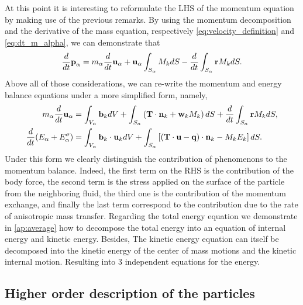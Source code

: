 At this point it is interesting to reformulate the LHS of the momentum equation by making use of the previous remarks. 
By using the momentum decomposition and the derivative of the mass equation, respectively \ref{eq:velocity_definition} and \ref{eq:dt_m_alpha}, we can demonstrate that
\begin{equation*}
    \frac{d}{d t} \textbf{p}_\alpha 
    = m_\alpha  \frac{d}{d t} \textbf{u}_\alpha
    + \textbf{u}_\alpha \int_{S_\alpha} M_k dS  
    - \frac{d}{d t} \int_{S_\alpha} \textbf{r}M_k dS.
\end{equation*}
Above all of those considerations, we can re-write the momentum and energy balance equations under a more simplified form, namely, 
\begin{align}
    \label{eq:u_alpha_dt}
    m_\alpha \frac{d}{d t} \textbf{u}_\alpha 
    &= \int_{V_\alpha} \textbf{b}_k dV
    + \int_{S_\alpha} \left(
    \textbf{T}\cdot\textbf{n}_k
    +\textbf{w}_k M_k
    \right)dS
    + \frac{d}{d t} \int_{S_\alpha} \textbf{r}M_k dS,\\
    \label{eq:dt_e_esig_alpha}
    \frac{d}{d t} (E_\alpha + E^\sigma_\alpha) 
    &= \int_{V_\alpha} \textbf{b}_k \cdot \textbf{u}_k dV
    + \int_{S_\alpha} \left[
        (\textbf{T}\cdot \textbf{u} 
    - \textbf{q})\cdot\textbf{n}_k 
    - M_k E_k 
    \right]dS.
\end{align}
Under this form we clearly distinguish the contribution of phenomenons to the momentum balance. 
Indeed, the first term on the RHS is the contribution of the body force, the second term is the stress applied on the surface of the particle from the neighboring fluid, the third one is the contribution of the momentum exchange, and finally the last term correspond to the contribution due to the rate of anisotropic mass transfer. 
Regarding the total energy equation we demonstrate in \ref{ap:average} how to decompose the total energy into an equation of internal energy and kinetic energy. 
Besides, The kinetic energy equation can itself be decomposed into the kinetic energy of the center of mass motions and the kinetic internal motion.
Resulting into 3 independent equations for the energy.  

\subsection{Higher order description of the particles}

